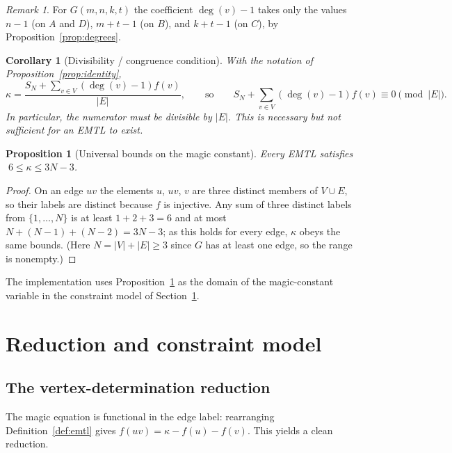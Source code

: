 \documentclass[11pt,a4paper]{article}
\theoremstyle{plain}
\newtheorem{proposition}{Proposition}
\newtheorem{corollary}{Corollary}
\theoremstyle{definition}
\theoremstyle{remark}
\newtheorem*{remark}{Remark}
\newcommand{\km}{\kappa}
\newcommand{\Gfam}{G(m,n,k,t)}
\DeclareMathOperator{\degr}{deg}
\begin{document}
\begin{remark}
For $\Gfam$ the coefficient $\degr(v)-1$ takes only the values $n-1$ (on $A$ and $D$),
$m+t-1$ (on $B$), and $k+t-1$ (on $C$), by Proposition~\ref{prop:degrees}.
\end{remark}

\begin{corollary}[Divisibility / congruence condition]\label{cor:divis}
With the notation of Proposition~\ref{prop:identity},
\[
  \km=\frac{S_N+\sum_{v\in V}(\degr(v)-1)f(v)}{|E|},
  \qquad\text{so}\qquad
  S_N+\sum_{v\in V}(\degr(v)-1)f(v)\equiv 0 \pmod{|E|}.
\]
In particular, the numerator must be divisible by $|E|$. This is necessary but not
sufficient for an EMTL to exist.
\end{corollary}

\begin{proposition}[Universal bounds on the magic constant]\label{prop:bounds}
Every EMTL satisfies $\;6\le \km\le 3N-3$.
\end{proposition}

\begin{proof}
On an edge $uv$ the elements $u$, $uv$, $v$ are three distinct members of $V\cup E$,
so their labels are distinct because $f$ is injective. Any sum of three distinct labels
from $\{1,\dots,N\}$ is at least $1+2+3=6$ and at most $N+(N-1)+(N-2)=3N-3$; as this
holds for every edge, $\km$ obeys the same bounds. (Here $N=|V|+|E|\ge 3$ since $G$ has
at least one edge, so the range is nonempty.)
\end{proof}

The implementation uses Proposition~\ref{prop:bounds} as the domain of the
magic-constant variable in the constraint model of Section~\ref{sec:model}.

\section{Reduction and constraint model}\label{sec:model}

\subsection{The vertex-determination reduction}

The magic equation is functional in the edge label: rearranging
Definition~\ref{def:emtl} gives $f(uv)=\km-f(u)-f(v)$. This yields a clean reduction.
\end{document}
